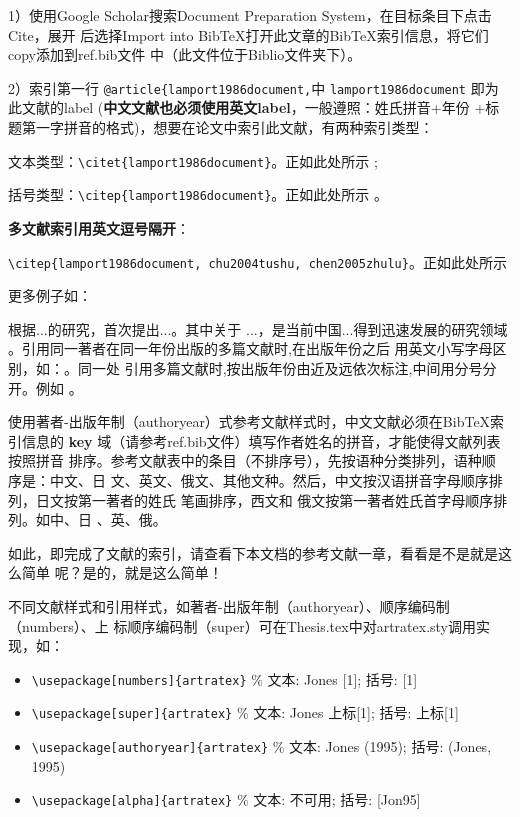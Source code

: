 1）使用Google Scholar搜索Document Preparation System，在目标条目下点击Cite，展开
后选择Import into BibTeX打开此文章的BibTeX索引信息，将它们copy添加到ref.bib文件
中（此文件位于Biblio文件夹下）。

2）索引第一行 \verb|@article{lamport1986document,|中 \verb|lamport1986document|
即为此文献的label (\textbf{中文文献也必须使用英文label}，一般遵照：姓氏拼音+年份
+标题第一字拼音的格式)，想要在论文中索引此文献，有两种索引类型：

文本类型：\verb|\citet{lamport1986document}|。正如此处所示
\citet{lamport1986document}; 

括号类型：\verb|\citep{lamport1986document}|。正如此处所示
\citep{lamport1986document}。

\textbf{多文献索引用英文逗号隔开}：

\verb|\citep{lamport1986document, chu2004tushu, chen2005zhulu}|。正如此处所示 \citep{lamport1986document, chu2004tushu, chen2005zhulu}

更多例子如：

\citet{walls2013drought}根据...的研究，首次提出...。其中关于
...\citep{walls2013drought}，是当前中国...得到迅速发展的研究领域
\citep{chen1980zhongguo}。引用同一著者在同一年份出版的多篇文献时,在出版年份之后
用英文小写字母区别，如：\citep{yuan2012lana, yuan2012lanb, yuan2012lanc}。同一处
引用多篇文献时,按出版年份由近及远依次标注,中间用分号分开。例如
\citep{chen1980zhongguo, stamerjohanns2009mathml, hls2012jinji, niu2013zonghe}。

使用著者-出版年制（authoryear）式参考文献样式时，中文文献必须在BibTeX索引信息的
\textbf{key} 域（请参考ref.bib文件）填写作者姓名的拼音，才能使得文献列表按照拼音
排序。参考文献表中的条目（不排序号），先按语种分类排列，语种顺 序是：中文、日
文、英文、俄文、其他文种。然后，中文按汉语拼音字母顺序排列，日文按第一著者的姓氏
笔画排序，西文和 俄文按第一著者姓氏首字母顺序排列。如中\citep{niu2013zonghe}、日
\citep{Bohan1928}、英\citep{stamerjohanns2009mathml}、俄\citep{Dubrovin1906}。

如此，即完成了文献的索引，请查看下本文档的参考文献一章，看看是不是就是这么简单
呢？是的，就是这么简单！

不同文献样式和引用样式，如著者-出版年制（authoryear）、顺序编码制（numbers）、上
标顺序编码制（super）可在Thesis.tex中对artratex.sty调用实现，如：
\begin{itemize}
    \footnotesize
    \item \verb+\usepackage[numbers]{artratex}+ $\%$ 文本: Jones [1]; 括号: [1]
    \item \verb+\usepackage[super]{artratex}+ $\%$ 文本: Jones 上标[1]; 括号: 上标[1]
    \item \verb+\usepackage[authoryear]{artratex}+ $\%$ 文本: Jones (1995); 括号: (Jones, 1995)
    \item \verb+\usepackage[alpha]{artratex}+ $\%$ 文本: 不可用; 括号: [Jon95]
\end{itemize}

